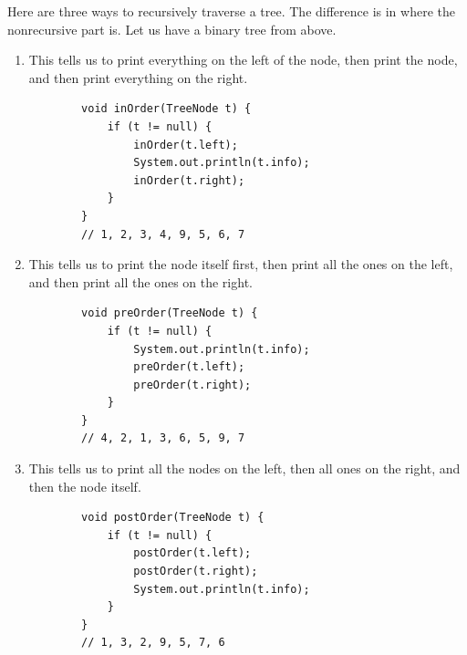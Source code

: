 \documentclass{article}
\begin{document}
    \begin{theorem}
      Here are three ways to recursively traverse a tree. The difference is in where the nonrecursive part is. Let us have a binary tree from above. 
      \begin{enumerate}
        \item This tells us to print everything on the left of the node, then print the node, and then print everything on the right. 
        \begin{lstlisting}
        void inOrder(TreeNode t) {
            if (t != null) {
                inOrder(t.left);
                System.out.println(t.info); 
                inOrder(t.right); 
            }
        }
        // 1, 2, 3, 4, 9, 5, 6, 7
        \end{lstlisting}
        
        \item This tells us to print the node itself first, then print all the ones on the left, and then print all the ones on the right. 
        \begin{lstlisting}
        void preOrder(TreeNode t) {
            if (t != null) {
                System.out.println(t.info); 
                preOrder(t.left); 
                preOrder(t.right); 
            }
        }
        // 4, 2, 1, 3, 6, 5, 9, 7
        \end{lstlisting}
        
        \item This tells us to print all the nodes on the left, then all ones on the right, and then the node itself. 
        \begin{lstlisting}
        void postOrder(TreeNode t) {
            if (t != null) {
                postOrder(t.left); 
                postOrder(t.right); 
                System.out.println(t.info); 
            }
        }
        // 1, 3, 2, 9, 5, 7, 6
        \end{lstlisting}
      \end{enumerate}
    \end{theorem}
\end{document}
